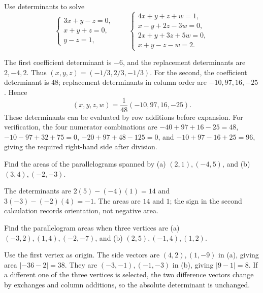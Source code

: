 \begin{problem}\label{ex:07:cramer-lang}
Use determinants to solve
\[
 \begin{cases}3x+y-z=0,\\x+y+z=0,\\y-z=1,\end{cases}
 \qquad
 \begin{cases}
 4x+y+z+w=1,\\x-y+2z-3w=0,\\2x+y+3z+5w=0,\\x+y-z-w=2.
 \end{cases}
\]
\end{problem}
\begin{solution}
The first coefficient determinant is \(-6\), and the replacement
determinants are \(2,-4,2\). Thus
\((x,y,z)=(-1/3,2/3,-1/3)\).
For the second, the coefficient determinant is \(48\); replacement
determinants in column order are \(-10,97,16,-25\). Hence
\[
 (x,y,z,w)=\frac1{48}(-10,97,16,-25).
\]
These determinants can be evaluated by row additions before expansion.
For verification, the four numerator combinations are
\(-40+97+16-25=48\),
\(-10-97+32+75=0\),
\(-20+97+48-125=0\), and
\(-10+97-16+25=96\), giving the required right-hand side after division.
\end{solution}

\begin{problem}\label{ex:07:area}
Find the areas of the parallelograms spanned by
(a) \((2,1),(-4,5)\), and (b) \((3,4),(-2,-3)\).
\end{problem}
\begin{solution}
The determinants are \(2(5)-(-4)(1)=14\) and
\(3(-3)-(-2)(4)=-1\). The areas are \(14\) and \(1\); the sign in the
second calculation records orientation, not negative area.
\end{solution}

\begin{problem}\label{ex:07:vertices}
Find the parallelogram areas when three vertices are
(a) \((-3,2),(1,4),(-2,-7)\), and
(b) \((2,5),(-1,4),(1,2)\).
\end{problem}
\begin{solution}
Use the first vertex as origin. The side vectors are
\((4,2),(1,-9)\) in (a), giving area \(|-36-2|=38\).
They are \((-3,-1),(-1,-3)\) in (b), giving \(|9-1|=8\).
If a different one of the three vertices is selected, the two difference
vectors change by exchanges and column additions, so the absolute
determinant is unchanged.
\end{solution}

